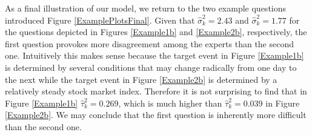 \documentclass[aoas, preprint]{imsart}
\numberwithin{equation}{section}
\theoremstyle{plain}
\begin{document}
As a final illustration of our model, we return to the two example questions introduced Figure \ref{ExamplePlotsFinal}. 
Given that $\hat{\sigma}_k^2 = 2.43$  and $\hat{\sigma}_k^2 = 1.77$ for the questions depicted in Figures \ref{Example1b} and \ref{Example2b}, respectively, the first question provokes more disagreement among the experts than the second one. Intuitively this makes sense because the target event in Figure \ref{Example1b}  is determined by several conditions that may change radically from one day to the next while the target event in Figure \ref{Example2b} is determined by a relatively steady stock market index. Therefore it is not surprising to find that in Figure \ref{Example1b} $\hat{\tau}_k^2 = 0.269$, which is much higher than $\hat{\tau}_k^2 = 0.039$ in Figure \ref{Example2b}. We may conclude that the first question is inherently more difficult than the second one. 
\end{document}
